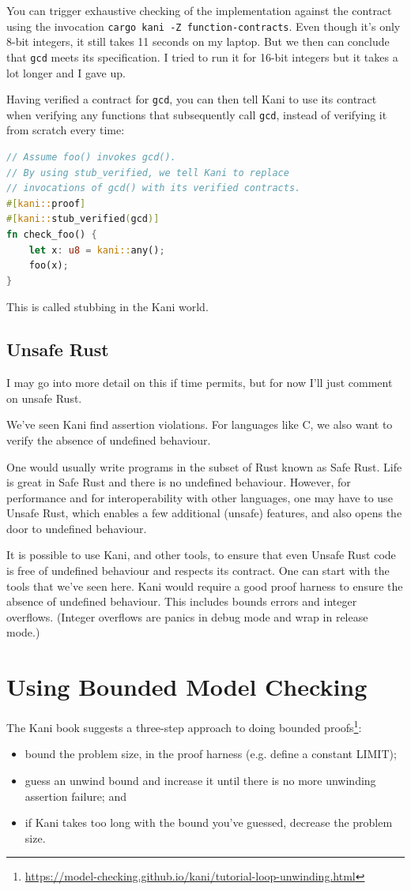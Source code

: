 \documentclass[11pt]{article}
\begin{document}
You can trigger exhaustive checking of the implementation against the contract using the invocation \verb+cargo kani -Z function-contracts+. Even though it's only 8-bit integers, it still takes 11 seconds on my laptop. But we then can conclude that
\texttt{gcd} meets its specification. I tried to run it for 16-bit integers but it takes a lot longer and I gave up.

Having verified a contract for \texttt{gcd}, you can then tell Kani to
use its contract when verifying any functions that subsequently call
\texttt{gcd}, instead of verifying it from scratch every time:
\begin{lstlisting}[language=Rust]
// Assume foo() invokes gcd().
// By using stub_verified, we tell Kani to replace 
// invocations of gcd() with its verified contracts.
#[kani::proof]
#[kani::stub_verified(gcd)]
fn check_foo() {
    let x: u8 = kani::any();
    foo(x);
}
\end{lstlisting}
This is called stubbing in the Kani world.

\subsection*{Unsafe Rust}
I may go into more detail on this if time permits, but for now I'll just comment on unsafe Rust.

We've seen Kani find assertion violations.
For languages like C, we also want to verify the absence of undefined behaviour.

One would usually write programs in the subset of Rust known as Safe Rust. Life is great in Safe Rust
and there is no undefined behaviour. However, for performance and for interoperability with other languages,
one may have to use Unsafe Rust, which enables a few additional (unsafe) features, and also opens the door to
undefined behaviour.

It is possible to use Kani, and other tools, to ensure that even
Unsafe Rust code is free of undefined behaviour and respects its
contract. One can start with the tools that we've seen here. Kani
would require a good proof harness to ensure the absence of undefined
behaviour.  This includes bounds errors and integer overflows. (Integer overflows are
panics in debug mode and wrap in release mode.)

\section*{Using Bounded Model Checking}
The Kani book suggests a three-step approach to doing bounded proofs\footnote{\url{https://model-checking.github.io/kani/tutorial-loop-unwinding.html}}:
\begin{itemize}[noitemsep]
\item bound the problem size, in the proof harness (e.g. define a constant \textsf{LIMIT});
\item guess an  \textsf{unwind} bound and increase it until there is no more unwinding assertion failure; and
\item if Kani takes too long with the bound you've guessed, decrease the problem size.
\end{itemize}
\end{document}

